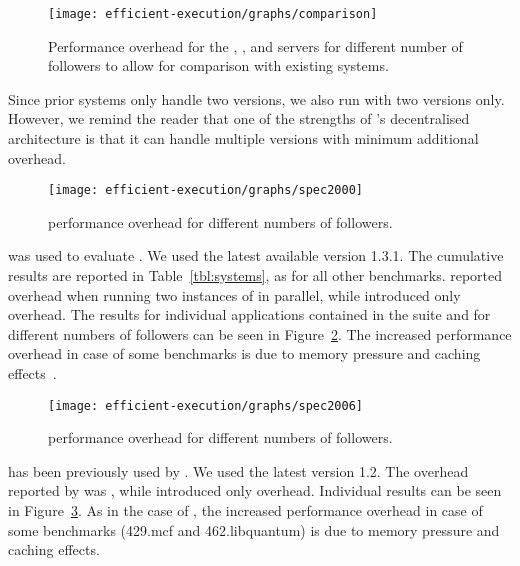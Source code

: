 \begin{figure}[!t]
 \centering
 \texttt{[image: efficient-execution/graphs/comparison]}
 \caption{Performance overhead for the \httpd, \thttpd, and \lighttpd
   servers for different number of followers to allow for comparison
   with existing systems.}
 \label{fig:comparison}
\end{figure}

Since prior systems only handle two versions, we also run \varan with
two versions only.  However, we remind the reader that one of the
strengths of \varan's decentralised architecture is that it can handle
multiple versions with minimum additional overhead.

\begin{figure}[!t]
  \centering
  \texttt{[image: efficient-execution/graphs/spec2000]}
  \caption{\speczerozero performance overhead for different numbers of followers.}
  \label{fig:spec2000}
\end{figure}

\boldtext{\speczerozero} %
was used to evaluate \orchestra. We used the latest available version
1.3.1.  The cumulative results are reported in
Table~\ref{tbl:systems}, as for all other benchmarks.  \orchestra
reported \orchestraSpec overhead when running two instances of
\speczerozero in parallel, while \varan introduced only
\speczerozeroOneFollower overhead. The results for individual
applications contained in the \speczerozero suite and for different
numbers of followers can be seen in Figure~\ref{fig:spec2000}. The
increased performance overhead in case of some benchmarks is due to
memory pressure and caching effects~\cite{jaleel07}.

\begin{figure}[!t]
  \centering
  \texttt{[image: efficient-execution/graphs/spec2006]}
  \caption{\speczerosix performance overhead for different numbers of followers.}
  \label{fig:spec2006}
\end{figure}

\boldtext{\speczerosix} %
has been previously used by \mx. We used the latest version 1.2.  The
overhead reported by \mx was \mxSpec, while \varan introduced only
\speczerosixOneFollower overhead.
Individual results can be seen in Figure~\ref{fig:spec2006}.  As in
the case of \speczerozero, the increased performance overhead in case
of some benchmarks (\ie \textsf{429.mcf} and \textsf{462.libquantum})
is due to memory pressure and caching effects. %

